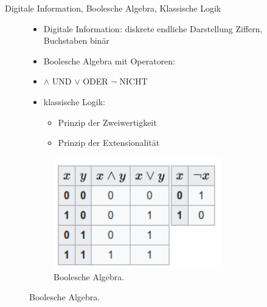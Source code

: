 \documentclass[aspectratio=1610, 9pt]{beamer}
\begin{document}
\begin{frame}{Digitale Information, Boolesche Algebra, Klassische Logik}
  \begin{figure}
    \begin{minipage}{0.7\textwidth}
      \begin{itemize}
        \item Digitale Information: diskrete endliche Darstellung \rightarrow Ziffern, Buchstaben \rightarrow binär
        \item Boolesche Algebra mit Operatoren:
        \item[] $\land$ UND $\lor$ ODER $\lnot$ NICHT
        \item klassische Logik:
        \begin{itemize}
          \item Prinzip der Zweiwertigkeit
          \item Prinzip der Extensionalität
        \end{itemize}
      \end{itemize}
    \end{minipage}
    \hfill
    \begin{minipage}{0.28\textwidth}
      \begin{figure}
        \includegraphics[width=0.8\textwidth]{images/bool.png}
        \caption{Boolesche Algebra. \footnotemark[7]}
      \end{figure}
    \end{minipage}
  \end{figure}
\end{frame}
\end{document}
